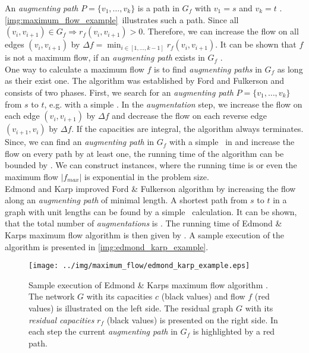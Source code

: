An \emph{augmenting path} $P = \{v_1,\ldots,v_k\}$ is a path in $G_f$ with $v_1 = s$ and 
$v_k = t$ \cite{edmonds1972theoretical}. \autoref{img:maximum_flow_example}~illustrates such a path.
Since all $(v_i,v_{i+1}) \in G_f \Rightarrow r_f(v_i,v_{i+1}) > 0$. 
Therefore, we can increase the flow on all edges $(v_i,v_{i+1})$ by 
$\Delta f = \min_{i \in [1,\ldots,k-1]} r_f(v_i,v_{i+1})$. It can be shown that $f$ is not a
maximum flow, if an \emph{augmenting path} exists in $G_f$ \cite{edmonds1972theoretical}. \\
One way to calculate a maximum flow $f$ is to find \emph{augmenting paths} in $G_f$ as
long as their exist one. The algorithm was established by Ford and Fulkerson \cite{ford1956maximal} and
consists of two phases. First, we search for an \emph{augmenting path} $P = \{v_1,\ldots,v_k\}$
from $s$ to $t$, e.g. with a simple \DFS. In the \emph{augmentation} step, we increase the flow on each
edge $(v_i,v_{i+1})$ by $\Delta f$ and decrease the flow on each reverse edge $(v_{i+1},v_i)$
by $\Delta f$. If the capacities are integral, the algorithm always terminates. Since, we can find an \emph{augmenting
path} in $G_f$ with a simple \DFS~in  and increase the
flow on every path by at least one, the running time of the algorithm can be bounded by .
We can construct instances, where the running time is  or even the maximum flow $|f_{max}|$ 
is exponential in the problem size. \\
Edmond and Karp \cite{edmonds1972theoretical} improved Ford \& Fulkerson algorithm by increasing the flow
along an \emph{augmenting path} of minimal length. A shortest path from $s$ to $t$ in a 
graph with unit lengths can be found by a simple \BFS~calculation. It can be shown, that the
total number of \emph{augmentations} is . The running time of Edmond \& Karps
maximum flow algorithm is then given by . A sample execution of the algorithm
is presented in \autoref{img:edmond_karp_example}.

\begin{figure}
\centering
\texttt{[image: ../img/maximum\_flow/edmond\_karp\_example.eps]}
\caption{Sample execution of Edmond \& Karps maximum flow algorithm \cite{edmonds1972theoretical}.
         The network $G$ with its capacities $c$ (black values) and flow $f$ (red values) is illustrated
         on the left side. The residual graph $G$ with its \emph{residual capacities} $r_f$ (black values)
         is presented on the right side. In each step the current \emph{augmenting path} in $G_f$ is highlighted
         by a red path. }
\label{img:edmond_karp_example}
\end{figure}

